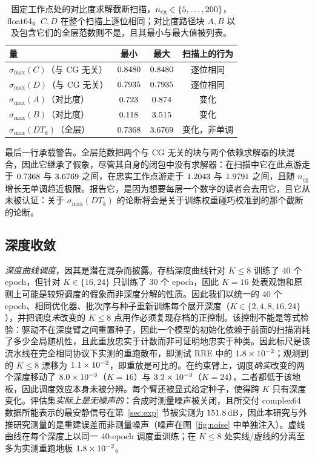 \documentclass[UTF8,a4paper,11pt]{ctexart}
\providecommand{\decibel}{dB}
\newcommand{\numv}[1]{#1}
\begin{document}
\begin{table}[htbp]
\centering
\caption{固定工作点处的对比度求解截断扫描，$n_{\mathrm{cg}}\in\{\numv{\NumCgNMin},\dots,\numv{\NumCgNMax}\}$，float64。$C,D$ 在整个扫描上逐位相同；对比度路径块 $A,B$ 以及包含它们的全层范数则不是，且其最小与最大值被列表。}
\label{tab:cgsweep}
\small
\begin{tabular}{lccc}
\toprule
量 & 最小 & 最大 & 扫描上的行为 \\
\midrule
$\sigma_{\max}(C)$（与 CG 无关） & $\numv{\NumCgCMin}$ & $\numv{\NumCgCMax}$ & 逐位相同 \\
$\sigma_{\max}(D)$（与 CG 无关） & $\numv{\NumCgDMin}$ & $\numv{\NumCgDMax}$ & 逐位相同 \\
$\sigma_{\max}(A)$（对比度） & $\numv{\NumCgAMin}$ & $\numv{\NumCgAMax}$ & 变化 \\
$\sigma_{\max}(B)$（对比度） & $\numv{\NumCgBMin}$ & $\numv{\NumCgBMax}$ & 变化 \\
$\sigma_{\max}(DT_k)$（全层） & $\numv{\NumCgFullMin}$ & $\numv{\NumCgFullMax}$ & 变化，非单调 \\
\bottomrule
\end{tabular}
\end{table}
最后一行承载警告。全层范数把两个与 CG 无关的块与两个依赖求解器的块混合，因此它继承了假象，尽管其自身的闭包中没有求解器：在扫描中它在此点游走于 $\numv{\NumCgFullMin}$ 与 $\numv{\NumCgFullMax}$ 之间，在忠实工作点游走于 $\numv{\NumCgFullFaithLo}$ 与 $\numv{\NumCgFullFaithHi}$ 之间，且随 $n_{\mathrm{cg}}$ 增长无单调趋近极限。报告它，是因为想要每层一个数字的读者会去用它，且它从未被认证：关于 $\sigma_{\max}(DT_k)$ 的论断将会是关于训练权重碰巧校准到的那个截断的论断。
\subsection{深度收敛}\label{sec:depth}

\emph{深度曲线调度}，因其是潜在混杂而披露。存档深度曲线针对 $K\le8$ 训练了 $40$ 个 epoch，但针对 $K\in\{16,24\}$ 只训练了 $30$ 个 epoch，因此 $K=16$ 处表观饱和原则上可能是较短调度的假象而非深度分解的性质。因此我们以统一的 $40$ 个 epoch、相同优化器、批次序与种子重新训练每个展开深度（$K\in\{2,4,8,16,24\}$），并把调度\emph{未}改变的 $K\le8$ 点用作必须复现存档的正控制。该控制不能是等式检验：驱动不在深度臂之间重置种子，因此一个模型的初始化依赖于前面的扫描消耗了多少全局随机性，且此重放忠实于计数而非可证明地忠实于种类。因此标尺是该流水线在完全相同协议下实测的重跑散布，即测试 RRE 中的 $\numv{\NumDepUniFloor}$；观测到的 $K\le8$ 漂移为 $\numv{\NumDepUniDrift}$，即重放是可比的。在约束臂上，调度\emph{确实}改变的两个深度移动了 $\numv{\NumDepUniShiftSixteen}$（$K=16$）与 $\numv{\NumDepUniShiftTwentyFour}$（$K=24$），二者都低于该地板，因此调度效应本身未被分辨。每个臂还被显式给定种子，使得跨 $K$ 只有深度变化。评估集\emph{实际上是无噪声的}：合成时测量噪声被关闭，且所交付 complex64 数据所能表示的最安静信号在第~\ref{sec:exp} 节被实测为 $\SI{\numv{\NumNoiseFloorDb}}{\decibel}$，因此本研究与外推研究测量的是重建误差而非测量噪声（噪声在图~\ref{fig:noise} 中单独注入）。虚线曲线在每个深度上以同一 $40$-epoch 调度重训练；在 $K\le8$ 处实线/虚线的分离至多为实测重跑地板 $\numv{\NumDepUniFloor}$。
\end{document}
